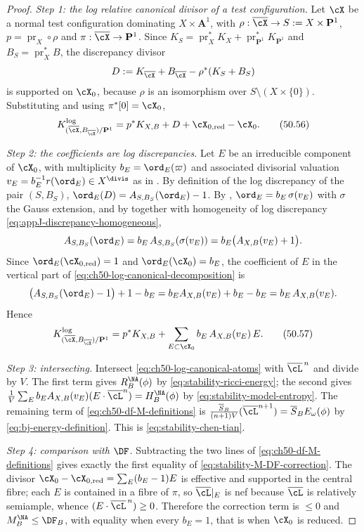 \begin{proof}
\emph{Step 1: the log relative canonical divisor of a test configuration.}
Let $\cX$ be a normal test configuration dominating
$X\times\mathbf A^1$, with $\rho:\overline\cX\to
S:=X\times\mathbf P^1$, $p=\operatorname{pr}_X\circ\rho$ and
$\pi:\overline\cX\to\mathbf P^1$.  Since $K_S=\operatorname{pr}_X^*K_X
+\operatorname{pr}_{\mathbf P^1}^*K_{\mathbf P^1}$ and
$B_S=\operatorname{pr}_X^*B$, the discrepancy divisor
\[
 D:=K_{\overline\cX}+B_{\overline\cX}-\rho^*(K_S+B_S)
\]
is supported on $\cX_0$, because $\rho$ is an isomorphism over
$S\setminus(X\times\{0\})$.  Substituting and using
$\pi^*[0]=\cX_0$,
\[
 K^{\log}_{(\overline\cX,B_{\overline\cX})/\mathbf P^1}
 =p^*K_{X,B}+D+\cX_{0,\mathrm{red}}-\cX_0 .
\tag{50.56}\label{eq:ch50-log-canonical-decomposition}
\]

\emph{Step 2: the coefficients are log discrepancies.}  Let $E$ be an
irreducible component of $\cX_0$, with multiplicity
$b_E=\ord_E(\varpi)$ and associated divisorial valuation
$v_E=b_E^{-1}r(\ord_E)\in X^{\divis}$ as in
.  By definition of the log discrepancy
of the pair $(S,B_S)$,
$\ord_E(D)=A_{S,B_S}(\ord_E)-1$.  By
, $\ord_E=b_E\,\sigma(v_E)$ with
$\sigma$ the Gauss extension, and by
 together with homogeneity of log
discrepancy \eqref{eq:appJ-discrepancy-homogeneous},
\[
 A_{S,B_S}(\ord_E)=b_E\,A_{S,B_S}(\sigma(v_E))
 =b_E\bigl(A_{X,B}(v_E)+1\bigr).
\]
Since $\ord_E(\cX_{0,\mathrm{red}})=1$ and
$\ord_E(\cX_0)=b_E$, the coefficient of $E$ in the vertical part of
\eqref{eq:ch50-log-canonical-decomposition} is
\[
 \bigl(A_{S,B_S}(\ord_E)-1\bigr)+1-b_E
 =b_EA_{X,B}(v_E)+b_E-b_E
 =b_E\,A_{X,B}(v_E).
\]
Hence
\[
 K^{\log}_{(\overline\cX,B_{\overline\cX})/\mathbf P^1}
 =p^*K_{X,B}+\sum_{E\subset\cX_0}b_E\,A_{X,B}(v_E)\,E .
\tag{50.57}\label{eq:ch50-log-canonical-atoms}
\]

\emph{Step 3: intersecting.}  Intersect
\eqref{eq:ch50-log-canonical-atoms} with $\overline\cL^{\,n}$ and divide
by $V$.  The first term gives $R^{\NA}_B(\phi)$ by
\eqref{eq:stability-ricci-energy}; the second gives
$\frac1V\sum_Eb_EA_{X,B}(v_E)(E\cdot\overline\cL^n)=H^{\NA}_B(\phi)$ by
\eqref{eq:stability-model-entropy}.  The remaining term of
\eqref{eq:ch50-df-M-definitions} is
$\frac{\overline S_B}{(n+1)V}(\overline\cL^{n+1})
=\overline S_BE_\omega(\phi)$ by
\eqref{eq:bj-energy-definition}.  This is
\eqref{eq:stability-chen-tian}.

\emph{Step 4: comparison with $\DF$.}  Subtracting the two lines of
\eqref{eq:ch50-df-M-definitions} gives exactly the first equality of
\eqref{eq:stability-M-DF-correction}.  The divisor
$\cX_0-\cX_{0,\mathrm{red}}=\sum_E(b_E-1)E$ is effective and supported in
the central fibre; each $E$ is contained in a fibre of $\pi$, so
$\overline\cL|_E$ is nef because $\overline\cL$ is relatively
semiample, whence $(E\cdot\overline\cL^{\,n})\ge0$.  Therefore the
correction term is $\le0$ and
$M^{\NA}_B\le\DF_B$, with equality when every $b_E=1$, that is when
$\cX_0$ is reduced.


\end{proof}
